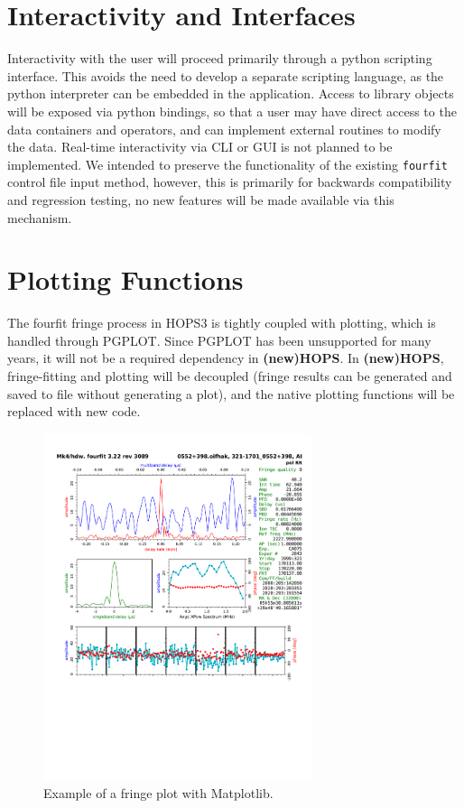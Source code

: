 \documentclass[hidelinks]{article}
\let\Oldsection\section
\renewcommand{\section}{\FloatBarrier\Oldsection}
\newcommand{\nuHOPS}{{\bf {\color{dkgreen} (new)HOPS}}}
\begin{document}
\section{Interactivity and Interfaces}

Interactivity with the user will proceed primarily through a python scripting interface. This avoids the need to develop a separate scripting language, 
as the python interpreter can be embedded in the application. Access to library objects will be exposed via python bindings, so that a user may have direct access 
to the data containers and operators, and can implement external routines to modify the data. Real-time interactivity via CLI or GUI is 
not planned to be implemented. We intended to preserve the functionality of the existing \texttt{fourfit} control file input method, however, this
is primarily for backwards compatibility and regression testing, no new features will be made available via this mechanism.


\section{Plotting Functions}

The fourfit fringe process in HOPS3 is tightly coupled with plotting, which is handled through PGPLOT. Since PGPLOT has been unsupported for many years, it will not be a required dependency in \nuHOPS. In \nuHOPS, fringe-fitting and plotting will be decoupled (fringe results can be generated and saved to file without generating a plot), and the native plotting functions will be replaced with new code. 

\begin{figure}[h!]
\begin{center}
  \includegraphics[width=0.7\textwidth]{matplotlib-fringe-plot.pdf}
    \caption{Example of a fringe plot with Matplotlib.}
    \label{fig:matplotlib-fringe-plot}
\end{center}
\end{figure}
\end{document}
